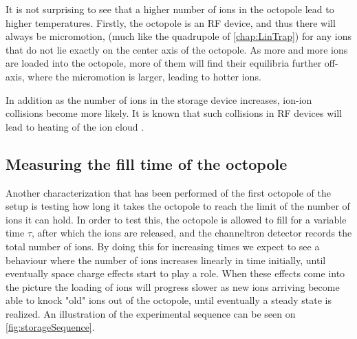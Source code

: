 It is not surprising to see that a higher number of ions in the octopole lead to higher temperatures. Firstly, the octopole is an RF device, and thus there will always be micromotion,
 (much like the quadrupole of \cref{chap:LinTrap}) for any ions that do not lie exactly on the center axis of the octopole. 
As more and more ions are loaded into the octopole, more of them will find their equilibria further off-axis, where the micromotion is larger, leading to hotter ions.

In addition as the number of ions in the storage device increases, ion-ion collisions become more likely. It is known that such collisions in RF devices will lead to heating of the ion cloud \cite{BlumelHeating,MichaelIonIonHeating}.


\subsection{Measuring the fill time of the octopole}
Another characterization that has been performed of the first octopole of the setup is testing how long it takes the octopole to reach the limit of the number of ions it can hold.
In order to test this, the octopole is allowed to fill for a variable time $\tau$, after which the ions are released, and the channeltron detector records the total number of ions.
By doing this for increasing times we expect to see a behaviour where the number of ions increases linearly in time initially, until eventually space charge effects start to play a role.
When these effects come into the picture the loading of ions will progress slower as new ions arriving become able to knock "old" ions out of the octopole, until eventually a steady state is realized.
An illustration of the experimental sequence can be seen on \cref{fig:storageSequence}. 

